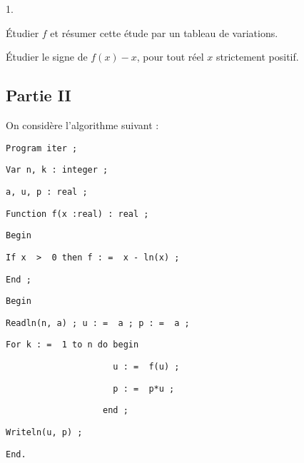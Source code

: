 \documentclass[11pt]{article}%
\begin{document}
\begin{noliste}{1.}
 \setlength{\itemsep}{4mm}
\item Étudier $f$ et résumer cette étude par un tableau de variations.

\item Étudier le signe de $f(x)-x$, pour tout réel $x$ strictement
positif.
\end{noliste}

\subsection*{Partie II}

On considère l'algorithme suivant :

\texttt{Program\ iter\ ;}

\texttt{Var\ n,\ k\ :\ integer\ ;}

\texttt{a,\ u,\ p\ :\ real\ ;}

\texttt{Function\ f(x\ :real)\ :\ real\ ;}

\texttt{Begin}

\texttt{If\ x\ \ > \ 0\ then\ f\ : = \ x\ -\ ln(x)\ ;}

\texttt{End\ ;}

\texttt{Begin}

\texttt{Readln(n,\ a)\ ;\ u\ : = \ a\ ;\ p\ : = \ a\ ;}

\texttt{For\ k\ : = \ 1\ to\ n\ do\ begin}

\texttt{\ \ \ \ \ \ \ \ \ \ \ \ \ \ \ \ \ \ \ \ \ u\ : = \ f(u)\ ;}

\texttt{\ \ \ \ \ \ \ \ \ \ \ \ \ \ \ \ \ \ \ \ \ p\ : = \ p*u\ ;}

\texttt{\ \ \ \ \ \ \ \ \ \ \ \ \ \ \ \ \ \ \ end\ ;}

\texttt{Writeln(u,\ p)\ ;}

\texttt{End.}
\end{document}

